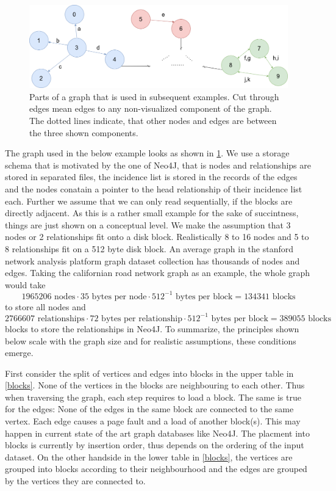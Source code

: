   \begin{figure}[htp]
    \begin{center}
        \includegraphics[keepaspectratio,height=0.3\textheight,width=\textwidth]{img/05-problem_def/example_graph.png}
    \end{center}
    \caption{Parts of a graph that is used in subsequent examples. Cut through edges mean edges to any non-visualized component of the graph. The dotted lines indicate, that other nodes and edges are between the three shown components.}
    \label{ex-gr}
  \end{figure}
  
  The graph used in the below example looks as shown in \ref{ex-gr}.
  We use a storage schema that is motivated by the one of Neo4J, that is nodes and relationships are stored in separated files, the incidence list is stored in the records of the edges and the nodes conatain a pointer to the head relationship of their incidence list each. Further we assume that we can only read sequentially, if the blocks are directly adjacent.
  As this is a rather small example for the sake of succintness, things are just shown on a conceptual level. 
  We make the assumption that 3 nodes or 2 relationships fit onto a disk block. 
  Realistically 8 to 16 nodes and 5 to 8 relationships fit on a 512 byte disk block. 
  An average graph in the stanford network analysis platform graph dataset collection has thousands of nodes and edges. 
  Taking the californian road network graph as an example, the whole graph would take 
  \[ 1 965 206 \text{ nodes} \cdot 35 \text{ bytes per node} \cdot 512^{-1} \text{ bytes per block} = 134 341\text{ blocks}\] 
  to store all nodes and 
  \[2 766 607 \text{ relationships} \cdot 72 \text{ bytes per relationship} \cdot 512^{-1} \text{ bytes per block} = 389055\text{ blocks}\] 
  blocks to store the relationships in Neo4J.
  To summarize, the principles shown below scale with the graph size and for realistic assumptions, these conditions emerge.

  First consider the split of vertices and edges into blocks in the upper table in \ref{blocks}. 
  None of the vertices in the blocks are neighbouring to each other.
  Thus when traversing the graph, each step requires to load a block.
  The same is true for the edges: 
  None of the edges in the same block are connected to the same vertex. 
  Each edge causes a page fault and a load of another block(s).
  This may happen in current state of the art graph databases like Neo4J. 
  The placment into blocks is currently by insertion order, thus depends on the ordering of the input dataset. 
  On the other handside in the lower table in \ref{blocks}, the vertices are grouped into blocks according to their neighbourhood and the edges are grouped by the vertices they are connected to.


